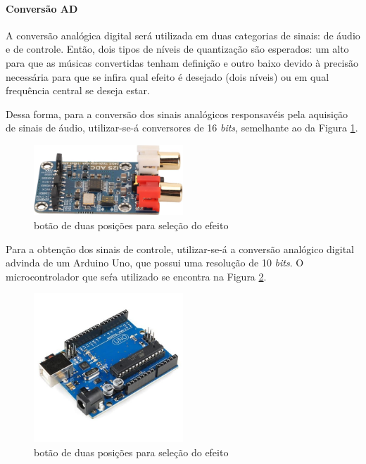     \paragraph{Conversão AD}

    A conversão analógica digital será utilizada em duas categorias de sinais: de áudio e de controle. Então, dois tipos de níveis de quantização são esperados: um alto para que as músicas convertidas tenham definição e outro baixo devido à precisão necessária para que se infira qual efeito é desejado (dois níveis) ou em qual frequência central se deseja estar.

    Dessa forma, para a conversão dos sinais analógicos responsavéis pela aquisição de sinais de áudio, utilizar-se-á conversores de 16 \textit{bits}, semelhante ao da Figura \ref{fig63}.
    
    \begin{figure}[h]
        \centering
        \includegraphics[width=0.5\textwidth]{figuras/fig63.jpg}
        \caption{botão de duas posições para seleção do efeito}
        \label{fig63}
    \end{figure}    
    
    
    
    Para a obtenção dos sinais de controle, utilizar-se-á a conversão analógico digital advinda de um Arduino Uno, que possui uma resolução de 10 \textit{bits}. O microcontrolador que seŕa utilizado se encontra na Figura \ref{fig64}.

    \begin{figure}[h]
        \centering
        \includegraphics[width=0.5\textwidth]{figuras/fig64.jpeg}
        \caption{botão de duas posições para seleção do efeito}
        \label{fig64}
    \end{figure}    

